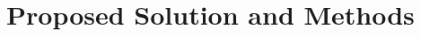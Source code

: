\documentclass[11pt,letterpaper]{article}
\newcommand{\aur}{\textsc{Aurora}}
\newcommand{\cmark}{\textcolor{aurTeal}{\ding{51}}}
\newcommand{\pmark}{\textcolor{aurOrange}{$\circ$}}
\begin{document}


\section{Proposed Solution and Methods}\label{sec:solution}
\end{document}
